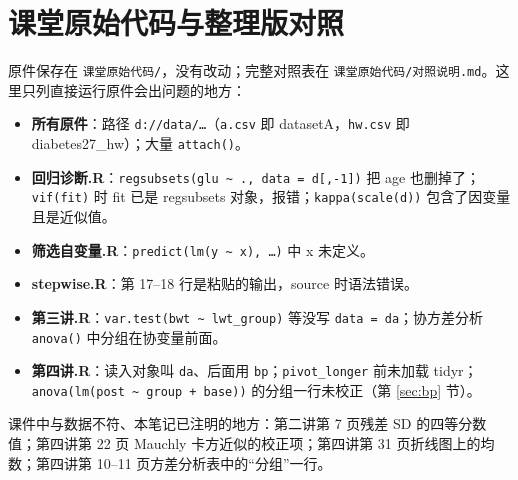 \section{课堂原始代码与整理版对照}
\label{app:orig}
原件保存在 \Verb|课堂原始代码/|，没有改动；完整对照表在 \Verb|课堂原始代码/对照说明.md|。这里只列直接运行原件会出问题的地方：

\begin{itemize}
\item \textbf{所有原件}：路径 \Verb|d://data/…|（\Verb|a.csv| 即 datasetA，\Verb|hw.csv| 即 diabetes27\_hw）；大量 \Verb|attach()|。
\item \textbf{回归诊断.R}：\Verb|regsubsets(glu ~ ., data = d[,-1])| 把 age 也删掉了；\Verb|vif(fit)| 时 fit 已是 regsubsets 对象，报错；\Verb|kappa(scale(d))| 包含了因变量且是近似值。
\item \textbf{筛选自变量.R}：\Verb|predict(lm(y ~ x), …)| 中 x 未定义。
\item \textbf{stepwise.R}：第 17–18 行是粘贴的输出，source 时语法错误。
\item \textbf{第三讲.R}：\Verb|var.test(bwt ~ lwt_group)| 等没写 \Verb|data = da|；协方差分析 \Verb|anova()| 中分组在协变量前面。
\item \textbf{第四讲.R}：读入对象叫 \Verb|da|、后面用 \Verb|bp|；\Verb|pivot_longer| 前未加载 tidyr；\Verb|anova(lm(post ~ group + base))| 的分组一行未校正（第 \ref{sec:bp} 节）。
\end{itemize}

课件中与数据不符、本笔记已注明的地方：第二讲第 7 页残差 SD 的四等分数值；第四讲第 22 页 Mauchly 卡方近似的校正项；第四讲第 31 页折线图上的均数；第四讲第 10–11 页方差分析表中的“分组”一行。
